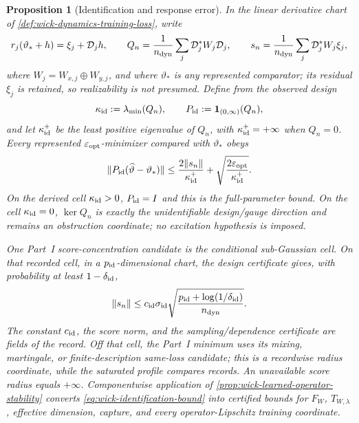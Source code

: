 \documentclass[11pt]{article}
\numberwithin{section}{part}
\theoremstyle{plain}
\newtheorem{proposition}[proposition]{Proposition}
\theoremstyle{definition}
\theoremstyle{remark}
\begin{document}
\begin{proposition}[Identification and response error]
\label{prop:wick-dynamics-identification}
In the linear derivative chart of
\cref{def:wick-dynamics-training-loss}, write
\[
 r_j(\vartheta_*+h)=\xi_j+\mathcal D_jh,
 \qquad
 Q_n=\frac1{n_{\rm dyn}}\sum_j
 \mathcal D_j^*W_j\mathcal D_j,
 \qquad
 s_n=\frac1{n_{\rm dyn}}\sum_j\mathcal D_j^*W_j\xi_j,
\]
where \(W_j=W_{x,j}\oplus W_{y,j}\), and where \(\vartheta_*\) is any
represented comparator; its residual \(\xi_j\) is retained, so realizability
is not presumed.  Define from the observed design
\[
 \kappa_{\rm id}:=\lambda_{\min}(Q_n),\qquad
 P_{\rm id}:=\mathbf1_{(0,\infty)}(Q_n),
\]
and let \(\kappa_{\rm id}^+\) be the least positive eigenvalue of \(Q_n\),
with \(\kappa_{\rm id}^+=+\infty\) when \(Q_n=0\).  Every represented
\(\varepsilon_{\rm opt}\)-minimizer compared with \(\vartheta_*\) obeys
\begin{equation}
 \label{eq:wick-identification-bound}
 \|P_{\rm id}(\widehat\vartheta-\vartheta_*)\|
 \le
 \frac{2\|s_n\|}{\kappa_{\rm id}^+}
 +\sqrt{\frac{2\varepsilon_{\rm opt}}{\kappa_{\rm id}^+}}.
\end{equation}
On the derived cell \(\kappa_{\rm id}>0\), \(P_{\rm id}=I\) and this is the
full-parameter bound.  On the cell \(\kappa_{\rm id}=0\),
\(\ker Q_n\) is exactly the unidentifiable design/gauge direction and remains
an obstruction coordinate; no excitation hypothesis is imposed.

One Part~I score-concentration candidate is the conditional sub-Gaussian
cell.  On that recorded cell, in a \(p_{\rm id}\)-dimensional chart, the
design certificate gives, with probability at least
\(1-\delta_{\rm id}\),
\begin{equation}
 \label{eq:wick-identification-concentration}
 \|s_n\|
 \le c_{\rm id}\sigma_{\rm id}
 \sqrt{\frac{p_{\rm id}+\log(1/\delta_{\rm id})}{n_{\rm dyn}}}.
\end{equation}
The constant \(c_{\rm id}\), the score norm, and the sampling/dependence
certificate are fields of the record.  Off that cell, the Part~I minimum uses
its mixing, martingale, or finite-description same-loss candidate; this is a
recordwise radius coordinate, while the saturated profile compares records.
An unavailable
score radius equals \(+\infty\).  Componentwise application of
\cref{prop:wick-learned-operator-stability} converts
\eqref{eq:wick-identification-bound} into certified bounds for
\(F_W\), \(T_{W,\lambda}\), effective dimension, capture, and every
operator-Lipschitz training coordinate.
\end{proposition}
\end{document}
